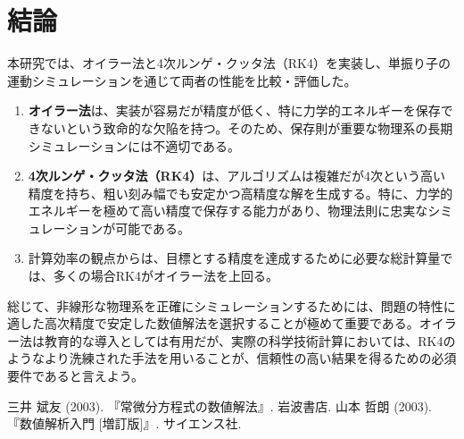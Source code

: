 \documentclass{article}
\begin{document}
\section{結論}
本研究では、オイラー法と4次ルンゲ・クッタ法（RK4）を実装し、単振り子の運動シミュレーションを通じて両者の性能を比較・評価した。
\begin{enumerate}
    \item \textbf{オイラー法}は、実装が容易だが精度が低く、特に力学的エネルギーを保存できないという致命的な欠陥を持つ。そのため、保存則が重要な物理系の長期シミュレーションには不適切である。
    \item \textbf{4次ルンゲ・クッタ法（RK4）}は、アルゴリズムは複雑だが4次という高い精度を持ち、粗い刻み幅でも安定かつ高精度な解を生成する。特に、力学的エネルギーを極めて高い精度で保存する能力があり、物理法則に忠実なシミュレーションが可能である。
    \item 計算効率の観点からは、目標とする精度を達成するために必要な総計算量では、多くの場合RK4がオイラー法を上回る。
\end{enumerate}
総じて、非線形な物理系を正確にシミュレーションするためには、問題の特性に適した高次精度で安定した数値解法を選択することが極めて重要である。オイラー法は教育的な導入としては有用だが、実際の科学技術計算においては、RK4のようなより洗練された手法を用いることが、信頼性の高い結果を得るための必須要件であると言えよう。

\begin{thebibliography}{9}
     三井 斌友 (2003). 『常微分方程式の数値解法』. 岩波書店.
     山本 哲朗 (2003). 『数値解析入門 [増訂版]』. サイエンス社.
\end{thebibliography}

\appendix
\end{document}
